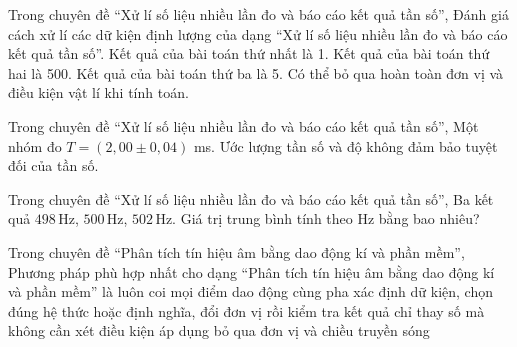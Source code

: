 \begin{ex}
Trong chuyên đề “Xử lí số liệu nhiều lần đo và báo cáo kết quả tần số”, Đánh giá cách xử lí các dữ kiện định lượng của dạng “Xử lí số liệu nhiều lần đo và báo cáo kết quả tần số”.
\choiceTF
{\True Kết quả của bài toán thứ nhất là 1.}
{\True Kết quả của bài toán thứ hai là 500.}
{\True Kết quả của bài toán thứ ba là 5.}
{Có thể bỏ qua hoàn toàn đơn vị và điều kiện vật lí khi tính toán.}
\end{ex}

\begin{ex}
Trong chuyên đề “Xử lí số liệu nhiều lần đo và báo cáo kết quả tần số”, Một nhóm đo $T=(2,00\pm0,04)$ ms. Ước lượng tần số và độ không đảm bảo tuyệt đối của tần số.
\choiceTF

\end{ex}

\begin{ex}
Trong chuyên đề “Xử lí số liệu nhiều lần đo và báo cáo kết quả tần số”, Ba kết quả $498\,\text{Hz}$, $500\,\text{Hz}$, $502\,\text{Hz}$. Giá trị trung bình tính theo Hz bằng bao nhiêu?
\end{ex}

\begin{ex}
Trong chuyên đề “Phân tích tín hiệu âm bằng dao động kí và phần mềm”, Phương pháp phù hợp nhất cho dạng “Phân tích tín hiệu âm bằng dao động kí và phần mềm” là
\choice
{luôn coi mọi điểm dao động cùng pha}
{\True xác định dữ kiện, chọn đúng hệ thức hoặc định nghĩa, đổi đơn vị rồi kiểm tra kết quả}
{chỉ thay số mà không cần xét điều kiện áp dụng}
{bỏ qua đơn vị và chiều truyền sóng}
\end{ex}


